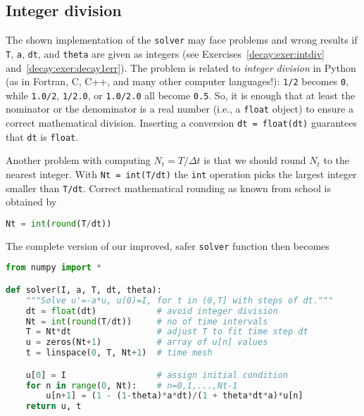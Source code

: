 \documentclass[graybox,sectrefs,envcountresetchap,open=right,final]{svmonodo}
\begin{document}
\subsection{Integer division}
\label{decay:py2}

The shown implementation of the \texttt{solver} may face problems and
wrong results if \texttt{T}, \texttt{a}, \texttt{dt}, and \texttt{theta} are given as integers
(see Exercises~\ref{decay:exer:intdiv} and~\ref{decay:exer:decay1err}).
The problem is related to \emph{integer division} in Python (as
in Fortran, C, C++, and many other computer languages!): \texttt{1/2} becomes \texttt{0},
while \texttt{1.0/2}, \texttt{1/2.0}, or \texttt{1.0/2.0} all become \texttt{0.5}. So, it is enough
that at least the nominator or the denominator is a real number
(i.e., a \texttt{float} object)
to ensure a correct mathematical division. Inserting
a conversion \texttt{dt = float(dt)}
guarantees that \texttt{dt} is
\texttt{float}.

Another problem with computing $N_t=T/\Delta t$ is that we should
round $N_t$ to the nearest integer. With \texttt{Nt = int(T/dt)} the \texttt{int}
operation picks the largest integer smaller than \texttt{T/dt}. Correct
mathematical rounding as known from school is obtained by


\begin{lstlisting}[language=python,style=blue1_bluegreen]
Nt = int(round(T/dt))

\end{lstlisting}

The complete version of our improved, safer \texttt{solver} function then becomes
















\begin{lstlisting}[language=python,style=blue1_bluegreen]
from numpy import *

def solver(I, a, T, dt, theta):
    """Solve u'=-a*u, u(0)=I, for t in (0,T] with steps of dt."""
    dt = float(dt)            # avoid integer division
    Nt = int(round(T/dt))     # no of time intervals
    T = Nt*dt                 # adjust T to fit time step dt
    u = zeros(Nt+1)           # array of u[n] values
    t = linspace(0, T, Nt+1)  # time mesh

    u[0] = I                  # assign initial condition
    for n in range(0, Nt):    # n=0,1,...,Nt-1
        u[n+1] = (1 - (1-theta)*a*dt)/(1 + theta*dt*a)*u[n]
    return u, t

\end{lstlisting}
\end{document}
